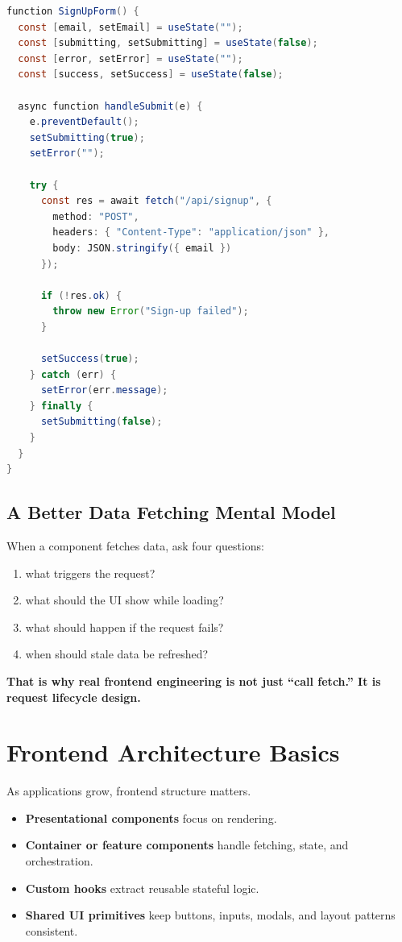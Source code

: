 \documentclass[12pt, a4paper, oneside]{book}
\begin{document}
\begin{lstlisting}[language=Java, caption={A practical React form pattern}]
function SignUpForm() {
  const [email, setEmail] = useState("");
  const [submitting, setSubmitting] = useState(false);
  const [error, setError] = useState("");
  const [success, setSuccess] = useState(false);

  async function handleSubmit(e) {
    e.preventDefault();
    setSubmitting(true);
    setError("");

    try {
      const res = await fetch("/api/signup", {
        method: "POST",
        headers: { "Content-Type": "application/json" },
        body: JSON.stringify({ email })
      });

      if (!res.ok) {
        throw new Error("Sign-up failed");
      }

      setSuccess(true);
    } catch (err) {
      setError(err.message);
    } finally {
      setSubmitting(false);
    }
  }
}
\end{lstlisting}

\subsection{A Better Data Fetching Mental Model}

When a component fetches data, ask four questions:
\begin{enumerate}[leftmargin=2em]
    \item what triggers the request?
    \item what should the UI show while loading?
    \item what should happen if the request fails?
    \item when should stale data be refreshed?
\end{enumerate}

\textbf{That is why real frontend engineering is not just ``call fetch.'' It is request lifecycle design.}

\section{Frontend Architecture Basics}

As applications grow, frontend structure matters.

\begin{itemize}[leftmargin=2em]
    \item \textbf{Presentational components} focus on rendering.
    \item \textbf{Container or feature components} handle fetching, state, and orchestration.
    \item \textbf{Custom hooks} extract reusable stateful logic.
    \item \textbf{Shared UI primitives} keep buttons, inputs, modals, and layout patterns consistent.
\end{itemize}
\end{document}
